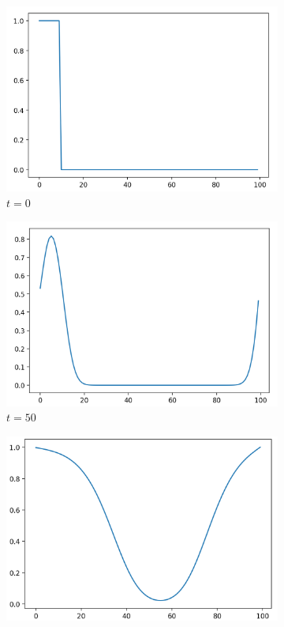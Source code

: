\documentclass[12pt, letterpaper]{article}
\begin{document}
\begin{figure}[h]
  \caption{Fisher Equation Example}
  \label{fig:fisherGraphs}
  \centering
  \begin{subfigure}[b]{.23\linewidth}
    \includegraphics[width=\linewidth]{Fisher/f0.png}
    \caption{$t=0$}
  \end{subfigure}
  \begin{subfigure}[b]{.23\linewidth}
    \includegraphics[width=\linewidth]{Fisher/f50.png}
    \caption{$t=50$}
  \end{subfigure}
  \begin{subfigure}[b]{.23\linewidth}
    \includegraphics[width=\linewidth]{Fisher/f500.png}

\end{subfigure}
\end{figure}
\end{document}
